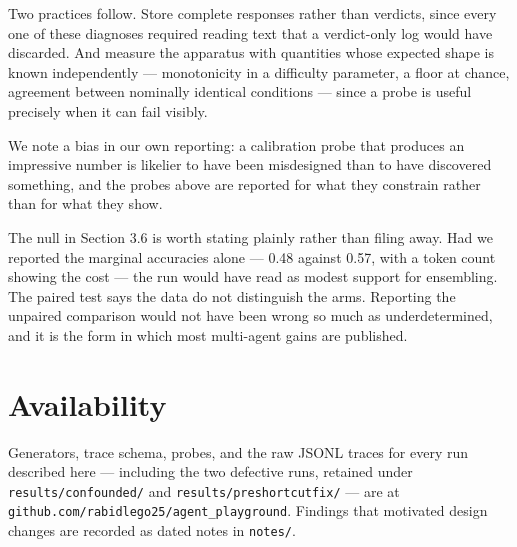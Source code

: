 \documentclass[10pt,twocolumn]{article}
\begin{document}
Two practices follow. Store complete responses rather than verdicts, since every one of these
diagnoses required reading text that a verdict-only log would have discarded. And measure the
apparatus with quantities whose expected shape is known independently --- monotonicity in a
difficulty parameter, a floor at chance, agreement between nominally identical conditions --- since
a probe is useful precisely when it can fail visibly.

We note a bias in our own reporting: a calibration probe that produces an impressive number is
likelier to have been misdesigned than to have discovered something, and the probes above are
reported for what they constrain rather than for what they show.

The null in Section 3.6 is worth stating plainly rather than filing away. Had we reported the
marginal accuracies alone --- 0.48 against 0.57, with a token count showing the cost --- the run
would have read as modest support for ensembling. The paired test says the data do not distinguish
the arms. Reporting the unpaired comparison would not have been wrong so much as underdetermined,
and it is the form in which most multi-agent gains are published.

\section{Availability}

Generators, trace schema, probes, and the raw JSONL traces for every run described here --- including
the two defective runs, retained under \texttt{results/confounded/} and
\texttt{results/preshortcutfix/} --- are at
\texttt{github.com/rabidlego25/agent\_playground}. Findings that motivated design changes are
recorded as dated notes in \texttt{notes/}.
\end{document}
